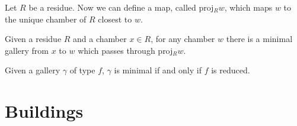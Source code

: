 \documentclass[11pt]{article}
\begin{document}
Let $R$ be a residue. Now we can define a map, called proj$_Rw$, which maps $w$ to the unique chamber of $R$ closest to $w$. 


\begin{proposition}
    Given a residue $R$ and a chamber $x\in R$, for any chamber $w$ there is a minimal gallery from $x$ to $w$ which passes through proj$_Rw$. 
\end{proposition}


\begin{theorem}
    Given a gallery $\gamma$ of type $f$, $\gamma$ is minimal if and only if $f$ is reduced.
\end{theorem}







\section{Buildings}
\end{document}
